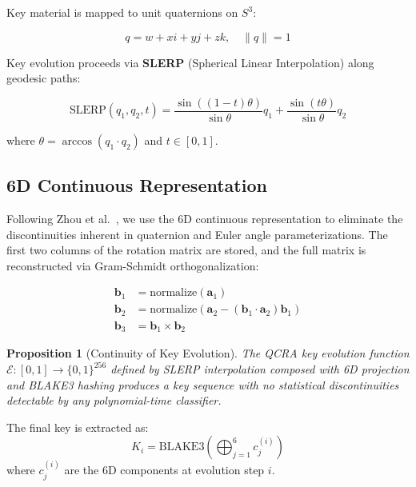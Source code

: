 \documentclass[11pt,a4paper]{article}
\newtheorem{proposition}[theorem]{Proposition}
\begin{document}
Key material is mapped to unit quaternions on $S^3$:

\begin{equation}
q = w + xi + yj + zk, \quad \|q\| = 1
\end{equation}

Key evolution proceeds via \textbf{SLERP} (Spherical Linear
Interpolation) along geodesic paths:

\begin{equation}
\text{SLERP}(q_1, q_2, t) = \frac{\sin((1-t)\theta)}{\sin\theta} q_1
+ \frac{\sin(t\theta)}{\sin\theta} q_2
\label{eq:slerp}
\end{equation}

where $\theta = \arccos(q_1 \cdot q_2)$ and $t \in [0, 1]$.

\subsection{6D Continuous Representation}

Following Zhou et al.~\cite{zhou2019}, we use the 6D continuous
representation to eliminate the discontinuities inherent in quaternion
and Euler angle parameterizations. The first two columns of the rotation
matrix are stored, and the full matrix is reconstructed via Gram-Schmidt
orthogonalization:

\begin{align}
\mathbf{b}_1 &= \text{normalize}(\mathbf{a}_1) \\
\mathbf{b}_2 &= \text{normalize}(\mathbf{a}_2 - (\mathbf{b}_1 \cdot \mathbf{a}_2)\mathbf{b}_1) \\
\mathbf{b}_3 &= \mathbf{b}_1 \times \mathbf{b}_2
\end{align}

\begin{proposition}[Continuity of Key Evolution]
The QCRA key evolution function $\mathcal{E}: [0,1] \to \{0,1\}^{256}$
defined by SLERP interpolation composed with 6D projection and BLAKE3
hashing produces a key sequence with no statistical discontinuities
detectable by any polynomial-time classifier.
\end{proposition}

The final key is extracted as:
\begin{equation}
K_i = \text{BLAKE3}\left(\bigoplus_{j=1}^{6} c_j^{(i)}\right)
\end{equation}
where $c_j^{(i)}$ are the 6D components at evolution step $i$.

\end{document}
